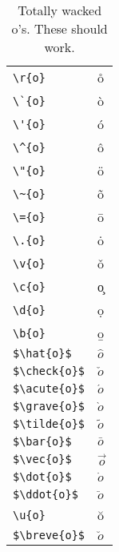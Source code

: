 \documentclass{article}
\begin{document}
\begin{table}
\begin{center}
\begin{tabular}{ll}
\verb#\r{o}#& \r{o}\\
\verb#\`{o}#& \`{o}\\
\verb#\'{o}#& \'{o}\\
\verb#\^{o}#& \^{o}\\
\verb#\"{o}#& \"{o}\\
\verb#\~{o}#& \~{o}\\
\verb#\={o}#& \={o}\\
\verb#\.{o}#& \.{o}\\
\verb#\v{o}#& \v{o}\\
\verb#\c{o}#& \c{o}\\
\verb#\d{o}#& \d{o}\\
\verb#\b{o}#& \b{o}\\
\verb#$\hat{o}$#& $\hat{o}$\\
\verb#$\check{o}$#& $\check{o}$\\
\verb#$\acute{o}$#& $\acute{o}$\\
\verb#$\grave{o}$#& $\grave{o}$\\
\verb#$\tilde{o}$#& $\tilde{o}$\\
\verb#$\bar{o}$#& $\bar{o}$\\
\verb#$\vec{o}$#& $\vec{o}$\\
\verb#$\dot{o}$#& $\dot{o}$\\
\verb#$\ddot{o}$#& $\ddot{o}$\\
\verb#\u{o}#& \u{o}\\
\verb#$\breve{o}$#& $\breve{o}$
\end{tabular}
\caption{Totally wacked o's.  These should work.}
\end{center}
\end{table}
\pagebreak
\end{document}

